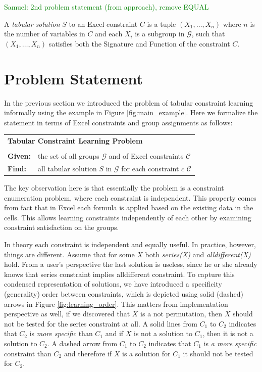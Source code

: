 \documentclass{ecai}
\newcommand{\samuel}[1]{\textcolor{green}{{\sc Samuel:} #1}\xspace}
\newcommand{\constraints}{\ensuremath{\mathcal{C}}\xspace}
\newcommand{\CSignature}{Signature\xspace}
\newcommand{\CFunction}{Function\xspace}
\newcommand{\groups}{\ensuremath{\mathcal{G}}\xspace}
\begin{document}
\samuel{2nd problem statement (from approach), remove EQUAL}

A \textit{tabular solution} $S$ to an Excel constraint $C$ is a tuple $(X_1, \dots, X_n)$ where $n$ is the number of variables in $C$ and each $X_i$ is a subgroup in \groups, such that $(X_1,\dots,X_n)$ satisfies both the \CSignature and \CFunction of the constraint $C$.

\section{Problem Statement}
In the previous section we introduced the problem of tabular constraint learning informally using the example in Figure \ref{fig:main_example}. Here we formalize the statement in terms of Excel constraints and group assignments as follows: 

\begin{minipage}[c]{14em}
  \vspace{5pt}
  \begin{tabular}{ll}
    \multicolumn{2}{l}{{\textbf{Tabular Constraint Learning Problem}}}\\
    \vspace{-4pt}
    &\\
    \textbf{Given:}& the set of all groups $\groups$ and of Excel constraints $\constraints$\\
    \textbf{Find:}&  all tabular solution $S$ in \groups for each constraint $c$ \constraints \\ 
  \end{tabular}
  \vspace{6pt}
\end{minipage}

  The key observation here is that essentially the problem is a constraint enumeration problem, where each constraint is independent. This property comes from fact that in Excel each formula is applied based on the existing data in the cells. This allows learning constraints independently of each other by examining constraint satisfaction on the groups.


  In theory each constraint is independent and equally useful. In practice, however, things are different. Assume that for some $X$ both \textit{series(X)} and \textit{alldifferent(X)} hold. From a user's perspective the last solution is useless, since he or she already knows that series constraint implies alldifferent constraint. To capture this condensed representation \cite{condensed} of solutions, we have introduced a specificity (generality) order between constraints, which is depicted using solid (dashed) arrows in Figure \ref{fig:learning_order}. This matters from implementation perspective as well, if we discovered that $X$ is a not permutation, then $X$ should not be tested for the series constraint at all. A solid lines from $C_1$ to $C_2$ indicates that $C_2$ is \textit{more specific} than $C_1$ and if $X$ is not a solution to $C_1$, then it is not a solution to $C_2$. A dashed arrow from $C_1$ to $C_2$ indicates that $C_1$ is \textit{a more specific} constraint than $C_2$ and therefore if $X$ is a solution for $C_1$ it should not be tested for $C_2$.
\end{document}
